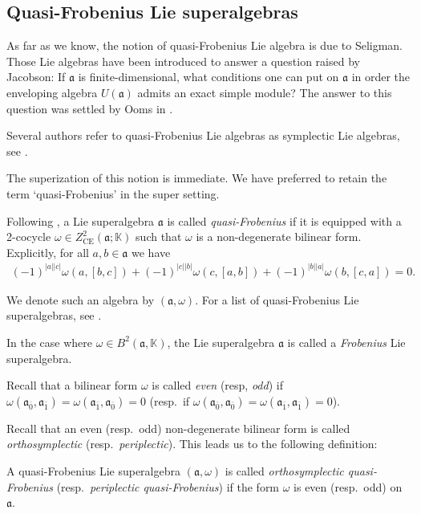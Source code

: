 \documentclass[pdftex]{sigma}
\numberwithin{equation}{section}
\begin{document}
\subsection{Quasi-Frobenius Lie superalgebras}\label{qFrobenius}

As far as we know, the notion of quasi-Frobenius Lie algebra is due to Seligman. Those Lie algebras have been introduced to answer a question raised by Jacobson: If $\mathfrak{a}$ is finite-dimensional,
what conditions one can put on $\mathfrak{a}$ in order the enveloping algebra $U(\mathfrak{a})$ admits an
exact simple module? The answer to this question was settled by Ooms in \cite{O}.

Several authors refer to quasi-Frobenius Lie algebras as symplectic Lie algebras, see \cite{AM, BC,BFLM,DM2,DM1, D, Fi, GR, MR2}.

The superization of this notion is immediate. We have preferred to retain the term ‘quasi-Frobenius’ in the super setting.

Following \cite{BaBe, BM}, a Lie superalgebra $\mathfrak{a}$ is called {\it quasi-Frobenius} if it is equipped with a 2-cocycle $\omega \in Z^2_ {\text{CE}}(\mathfrak{a}; \mathbb{K})$ such that $\omega$ is a non-degenerate bilinear form. Explicitly, for all $a,b\in \mathfrak{a}$ we have
\begin{gather*}%
(-1)^{|a||c|} \omega(a, [b , c]) +(-1)^{|c||b|} \omega(c, [a , b] )+(-1)^{|b||a|} \omega(b, [c , a] )=0.
\end{gather*}

We denote such an algebra by $(\mathfrak{a}, \omega)$. For a list of quasi-Frobenius Lie superalgebras, see \cite{BM}.

In the case where $\omega \in B^2(\mathfrak{a},\mathbb K)$, the Lie superalgebra $\mathfrak{a}$ is called a {\it Frobenius} Lie superalgebra.

Recall that a bilinear form $\omega$ is called {\it even} (resp, {\it odd}) if $\omega(\mathfrak{a}_{\bar 0}, \mathfrak{a}_{\bar 1})= \omega(\mathfrak{a}_{\bar 1},\mathfrak{a}_{\bar 0})=0$ (resp.\ if $\omega(\mathfrak{a}_{\bar 0}, \mathfrak{a}_{\bar 0})= \omega(\mathfrak{a}_{\bar 1},\mathfrak{a}_{\bar 1})=0$).

Recall that an even (resp.\ odd) non-degenerate bilinear form is called {\it orthosymplectic} (resp.\ {\it periplectic}). This leads us to the following definition:

A quasi-Frobenius Lie superalgebra $(\mathfrak{a}, \omega )$ is called {\it orthosymplectic quasi-Frobenius} (resp.\ {\it periplectic quasi-Frobenius}) if the form $\omega$ is even (resp.\ odd) on $\mathfrak{a}$.
\end{document}
